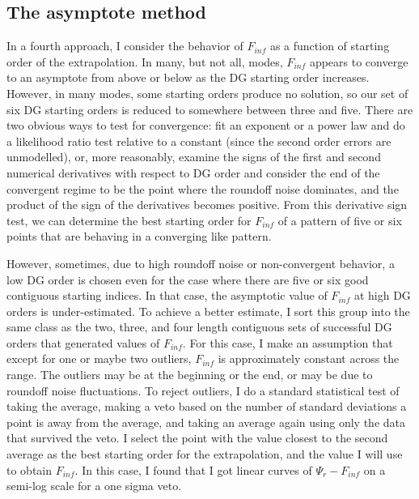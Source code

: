 \subsection{The asymptote method}
\label{asymptote}
In a fourth approach, I consider the behavior of $F_{inf}$ as a function of starting order of the extrapolation. In many, but not all, modes, $F_{inf}$ appears to converge to an asymptote from above or below as the DG starting order increases. However, in many modes, some starting orders produce no solution, so our set of six DG starting orders is reduced to somewhere between three and five. There are two obvious ways to test for convergence: fit an exponent or a power law and do a likelihood ratio test relative to a constant (since the second order errors are unmodelled), or, more reasonably, examine the signs of the first and second numerical derivatives with respect to DG order and consider the end of the convergent regime to be the point where the roundoff noise dominates, and the product of the sign of the derivatives becomes positive. From this derivative sign test, we can determine the best starting order for $F_{inf}$ of a pattern of five or six points that are behaving in a converging like pattern.

However, sometimes, due to high roundoff noise or non-convergent behavior, a low DG order is chosen even for the case where there are five or six good contiguous starting indices. In that case, the asymptotic value of $F_{inf}$ at high DG orders is under-estimated. To achieve a better estimate, I sort this group into the same class as the two, three, and four length contiguous sets of successful DG orders that generated values of $F_{inf}$. For this case, I make an assumption that except for one or maybe two outliers, $F_{inf}$ is approximately constant across the range. The outliers may be at the beginning or the end, or may be due to roundoff noise fluctuations. To reject outliers, I do a standard statistical test of taking the average, making a veto based on the number of standard deviations a point is away from the average, and taking an average again using only the data that survived the veto. I select the point with the value closest to the second average as the best starting order for the extrapolation, and the value I will use to obtain $F_{inf}$. In this case, I found that I got linear curves of $\Psi_r-F_{inf}$ on a semi-log scale for a one sigma veto.

